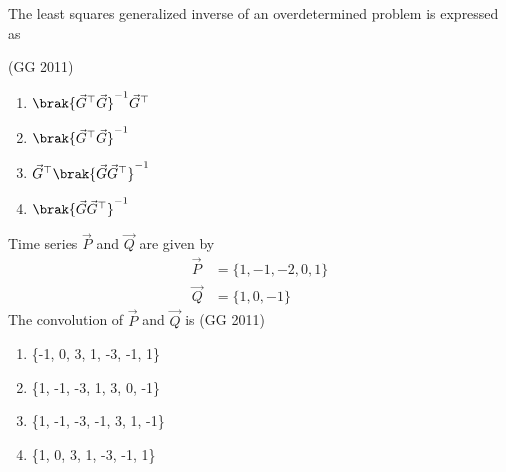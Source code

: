 \item The least squares generalized inverse of an overdetermined problem is expressed as  

\hfill{(GG 2011)}
\begin{multicols}{2}
\begin{enumerate}
	\item \(\brak{\vec{G}^\top \vec{G}}^{-1} \vec{G}^\top\)  
	\item \(\brak{\vec{G}^\top \vec{G}}^{-1}\)  
	\item \(\vec{G}^\top \brak{\vec{G} \vec{G}^\top}^{-1}\)  
	\item \(\brak{\vec{G} \vec{G}^\top}^{-1}\)  
\end{enumerate}
\end{multicols}
\item Time series $\vec{P}$ and $\vec{Q}$ are given by  
	\begin{align*}
		\vec{P} &= \{1, -1, -2, 0, 1\}  
		\\
\vec{Q} &= \{1, 0, -1\}
\end{align*}
The convolution of $\vec{P}$ and $\vec{Q}$ is  
\hfill{(GG 2011)}
\begin{multicols}{2}
\begin{enumerate}
\item \{-1, 0, 3, 1, -3, -1, 1\}  
\item \{1, -1, -3, 1, 3, 0, -1\}  
\item \{1, -1, -3, -1, 3, 1, -1\}  
\item \{1, 0, 3, 1, -3, -1, 1\}  
\end{enumerate}
\end{multicols}
